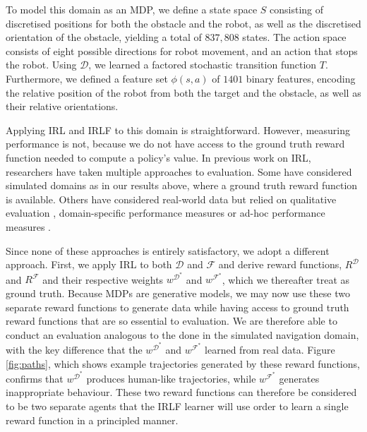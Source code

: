 \documentclass{aamas2016}
\begin{document}
To model this domain as an MDP, we define a state space $S$ consisting of discretised positions for both the obstacle and the robot, as well as the discretised orientation of the obstacle, yielding a total of $837,808$ states. The action space consists of eight possible directions for robot movement, and an action that stops the robot. Using $\mathcal{D}$, we learned a factored stochastic transition function $T$. Furthermore, we defined a feature set $\phi(s,a)$ of $1401$ binary features, encoding the relative position of the robot from both the target and the obstacle, as well as their relative orientations. 

Applying IRL and IRLF to this domain is straightforward.  However, measuring performance is not, because we do not have access to the ground truth reward function needed to compute a policy's value. In previous work on IRL, researchers have taken multiple approaches to evaluation.  Some have considered simulated domains \cite{levine2011nonlinear,syed2007game,rothkopf2011preference} as in our results above, where a ground truth reward function is available. Others have considered real-world data but relied on qualitative evaluation \cite{ratliff2006maximum}, domain-specific performance measures \cite{neu2009training} or ad-hoc performance measures \cite{vasquez2014inverse}.

Since none of these approaches is entirely satisfactory, we adopt a different approach. First, we apply IRL to both $\mathcal{D}$ and $\mathcal{F}$ and derive reward functions, $R^{\mathcal{D}}$ and $R^{\mathcal{F}}$ and their respective weights $w^{\mathcal{D}^*}$ and $w^{\mathcal{F}^*}$, which we thereafter treat as ground truth.
Because MDPs are generative models, we may now use these two separate reward functions to generate data while having access to ground truth reward functions that are so essential to evaluation. We are therefore able to conduct an evaluation analogous to the done in the simulated navigation domain, with the key difference that the $w^{\mathcal{D}^*}$ and $w^{\mathcal{F}^*}$ learned from real data. Figure \ref{fig:paths}, which shows example trajectories generated by these reward functions, confirms that $w^{\mathcal{D}^*}$ produces human-like trajectories, while $w^{\mathcal{F}^*}$ generates inappropriate behaviour. These two reward functions can therefore be considered to be two separate agents that the IRLF learner will use order to learn a single reward function in a principled manner.
\end{document}
